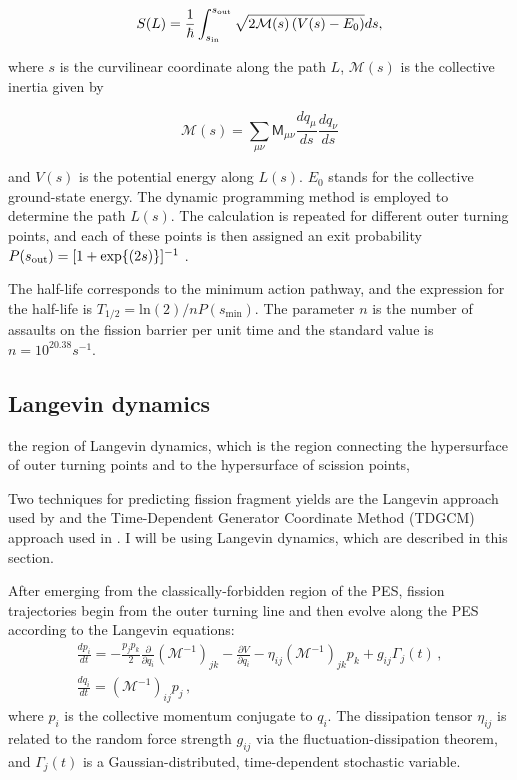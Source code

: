 \begin{equation}\label{eq:action} 
S(L) = \frac{1}{\hbar}\int_{s_{\rm in}}^{s_{\rm out}} \sqrt{2\mathcal{M}(s)\left(V(s)-E_0\right)}ds,
\end{equation} 

\noindent where $s$ is the curvilinear coordinate along the path $L$,
$\mathcal{M}(s)$ is the collective inertia given by \cite{Sadhukhan2013}

\begin{equation}
\mathcal{M}(s) = \sum_{\mu\nu} \mathsf{M}_{\mu\nu} \frac{dq_\mu}{ds} \frac{dq_\nu}{ds}
\end{equation}

\noindent and $V(s)$ is the potential energy along $L(s)$. $E_0$ stands for the collective ground-state
energy. The dynamic programming method \cite{Baran1981} is employed to determine
the path $L(s)$. The calculation is repeated for different outer turning points,
and each of these points is then assigned an exit  probability $P(s_{\rm out})=[1+\exp{(2s)}]^{-1}$ \cite{Baran1978}. 

The half-life corresponds to the minimum action pathway, and the expression for the half-life is $T_{1/2} = \mathrm{ln}(2)/nP(s_\mathrm{min})$. The parameter $n$ is the number of assaults on the fission barrier per unit time and the standard value is $n=10^{20.38} s^{-1}$.

\subsection{Langevin dynamics}

the region of Langevin dynamics, which is the region connecting the hypersurface of outer turning points and to the hypersurface of scission points,

Two techniques for predicting fission fragment yields are the Langevin approach used by \cite{Sadhukhan2016} and the Time-Dependent Generator Coordinate Method (TDGCM) approach used in \cite{Younes2012}. I will be using Langevin dynamics, which are described in this section.

After emerging from the classically-forbidden region of the PES, fission trajectories begin from the outer turning
line and then evolve along the PES according to the Langevin equations:
\begin{gather}\label{eq:langevin} 
	\frac{dp_i}{dt} =  
	-\frac{p_j p_k}{2} \frac{\partial}{\partial q_i}\left(\mathcal{M}^{-1}\right)_{jk} 
	- \frac{\partial V}{\partial q_i}  - \eta_{ij}\left(\mathcal{M}^{-1}\right)_{jk} p_k + g_{ij}\Gamma_j(t) \,, \\ 
	\frac{dq_i}{dt} = 	\left(\mathcal{M}^{-1}\right)_{ij} p_j \,,  
\end{gather} 
where $p_i$ is the collective momentum conjugate to $q_i$. The dissipation
tensor $\eta_{ij}$ is related to the random force strength $g_{ij}$ via the
fluctuation-dissipation theorem, and $\Gamma_j(t)$ is a Gaussian-distributed,
time-dependent stochastic variable.

